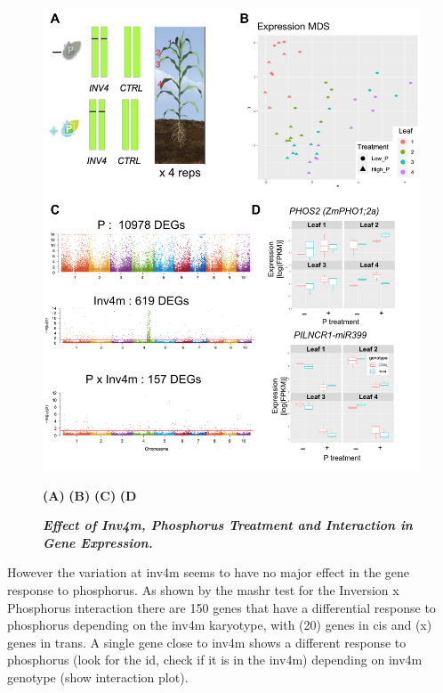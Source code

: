 \begin{figure}[!ht]
\centering
\includegraphics[width=\linewidth]{Chapter-3/figs/RNAseq.png}
\caption[Effect of Inv4m, Phosphorus Treatment and Interaction in Gene Expression]{\textit{\textbf{Effect of Inv4m, Phosphorus Treatment and Interaction in Gene Expression.}}}
\textbf{(A)} 
\textbf{(B)}
\textbf{(C)}
\textbf{(D}
\label{fig::\textbf{(B)}}
\end{figure}
\clearpage

However the variation at inv4m seems to have no major effect in the gene response to phosphorus.
As shown by the mashr test for the Inversion x Phosphorus interaction there are 150 genes that have a differential response to phosphorus depending on the inv4m karyotype, with (20) genes in cis and (x) genes in trans.
A single gene close to inv4m shows a different response  to phosphorus (look for the id, check if it is in the inv4m) depending on inv4m genotype (show interaction plot).

